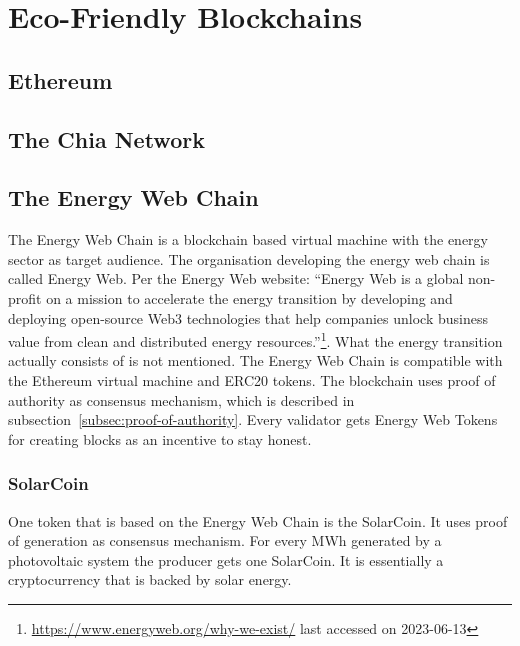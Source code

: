
\section{Eco-Friendly Blockchains}\label{sec:alternative-blockchains}

\subsection{Ethereum}\label{subsec:ethereum}

\subsection{The Chia Network}\label{subsec:chia}

\subsection{The Energy Web Chain}\label{subsec:the-energy-web-chain}
The Energy Web Chain is a blockchain based virtual machine with the energy sector as target audience.
The organisation developing the energy web chain is called Energy Web.
Per the Energy Web website: ``Energy Web is a global non-profit on a mission to accelerate the energy transition by developing and deploying open-source Web3 technologies that help companies unlock business value from clean and distributed energy resources.''\footnote{\url{https://www.energyweb.org/why-we-exist/} last accessed on 2023-06-13}.
What the energy transition actually consists of is not mentioned.
The Energy Web Chain is compatible with the Ethereum virtual machine and ERC20 tokens.
The blockchain uses proof of authority as consensus mechanism, which is described in subsection\ \ref{subsec:proof-of-authority}.
Every validator gets Energy Web Tokens for creating blocks as an incentive to stay honest.

\subsubsection{SolarCoin}
One token that is based on the Energy Web Chain is the SolarCoin.
It uses proof of generation as consensus mechanism.
For every MWh generated by a photovoltaic system the producer gets one SolarCoin.
It is essentially a cryptocurrency that is backed by solar energy.
